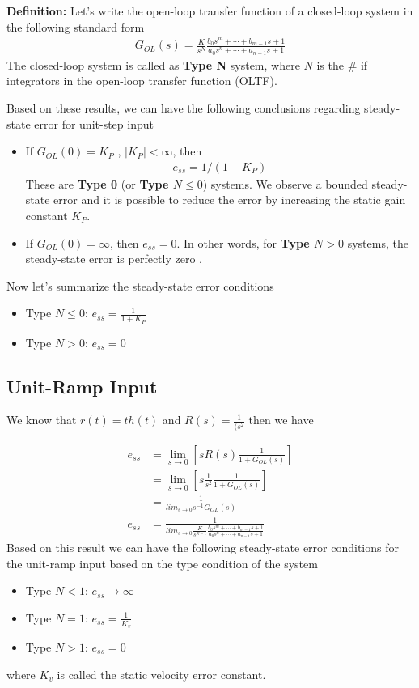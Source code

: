 \documentclass[twoside]{article}
\begin{document}
\textbf{Definition:} Let's write the open-loop transfer function of a closed-loop
system in the following standard form
%
\begin{align*}
G_{OL}(s) = \frac{K}{s^N} \frac{b_0 s^m + \cdots + b_{m-1} s + 1}{a_0 s^n + \cdots + a_{n-1} s + 1}
\end{align*}
%
The closed-loop system is called as \textbf{Type N} system, where
$N$ is the $\#$ if integrators in the open-loop transfer function (OLTF).

Based on these results, we can have the following conclusions
regarding steady-state error for unit-step input
%
\begin{itemize}
\item If $G_{OL} (0) = K_P$ , $| K_{P} | < \infty$, then 
\begin{align*}
e_{ss} =1/(1 + K_{P})
\end{align*}
% 
These are \textbf{Type 0} (or \textbf{Type $N \leq 0$})
systems. We observe a bounded steady-state error and it is possible to reduce the error by increasing the static gain
constant $K_P$. 
%
\item  If $G_{OL} (0) = \infty$, then $e_{ss} = 0$. In other words, for 
  \textbf{Type $N > 0$} systems, the steady-state error is perfectly zero .
\end{itemize}

Now let's summarize the steady-state error conditions
%
\begin{itemize}
\item Type $N \leq 0$: $e_{ss} =  \frac{1}{1 + K_{P}}$
\item Type $N > 0$: $e_{ss} = 0$
\end{itemize}

\subsection*{Unit-Ramp Input}
%
We know that $r(t) = t h(t)$ and $R(s) = \frac{1}{(s^2}$ then
we have

\begin{align*}
e_{ss} &= \lim_{s \to 0} \left[ s R(s) \frac{1}{1
         + G_{OL} (s) } \right]
\\
&= \lim_{s \to 0} \left[ s \frac{1}{s^2} \frac{1}{1
         + G_{OL} (s) } \right]
\\
 &= \frac{1}{lim_{s \to 0} s^{-1} G_{OL} (s) }
\\
e_{ss} &= \frac{1}{lim_{s \to 0} \frac{K}{s^{N-1}} \frac{b_0 s^m + \cdots + b_{m-1} s + 1}{a_0 s^n + \cdots + a_{n-1} s + 1} }
\end{align*}
%
Based on this result we can have the following steady-state
error conditions for the unit-ramp input based on the type 
condition of the system
%
\begin{itemize}
\item Type $N < 1$: $e_{ss} \to  \infty$
\item Type $N = 1$: $e_{ss} = \frac{1}{K_v}$
\item Type $N > 1$: $e_{ss} = 0$
\end{itemize}
%
where $K_v$ is called the static velocity error constant.
 
\end{document}
